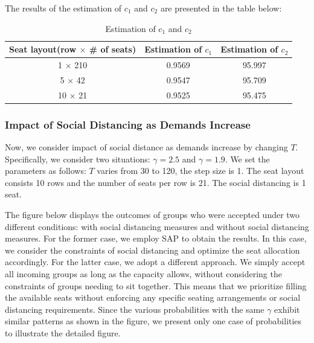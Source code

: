 The results of the estimation of $c_1$ and $c_2$ are presented in the table below:

\begin{table}[ht]
  \centering
  \caption{Estimation of $c_1$ and $c_2$}
  \begin{tabular}{|c|c|c|}
  \hline
   Seat layout(row $\times$ \# of seats) & Estimation of $c_1$ & Estimation of $c_2$  \\
  \hline
   1 $\times$ 210 & 0.9569 & 95.997 \\
   5 $\times$ 42 & 0.9547 & 95.709 \\
   10 $\times$ 21 & 0.9525 & 95.475 \\
   \hline
  \end{tabular}
\end{table}



\subsubsection{Impact of Social Distancing as Demands Increase}
Now, we consider impact of social distance as demands increase by changing $T$. Specifically, we consider two situations: $\gamma = 2.5$ and $\gamma = 1.9$. We set the parameters as follows: $T$ varies from 30 to 120, the step size is 1.  The seat layout consists 10 rows and the number of seats per row is 21. The social distancing is 1 seat.

The figure below displays the outcomes of groups who were accepted under two different conditions: with social distancing measures and without social distancing measures. For the former case, we employ SAP to obtain the results. In this case, we consider the constraints of social distancing and optimize the seat allocation accordingly. For the latter case, we adopt a different approach. We simply accept all incoming groups as long as the capacity allows, without considering the constraints of groups needing to sit together. This means that we prioritize filling the available seats without enforcing any specific seating arrangements or social distancing requirements. Since the various probabilities with the same $\gamma$ exhibit similar patterns as shown in the figure, we present only one case of probabilities to illustrate the detailed figure.

